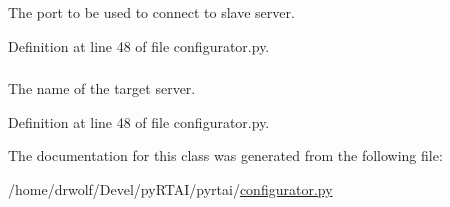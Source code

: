 \-The port to be used to connect to slave server. 



\-Definition at line 48 of file configurator.\-py.

\hypertarget{classpyrtai_1_1configurator_1_1_configurator_af1c86542bd418acd02cd9a9a01740458}{
\subsubsection[{target\-\_\-name}]{}}
\label{classpyrtai_1_1configurator_1_1_configurator_af1c86542bd418acd02cd9a9a01740458}


\-The name of the target server. 



\-Definition at line 48 of file configurator.\-py.



\-The documentation for this class was generated from the following file\-:\begin{DoxyCompactItemize}
\item 
/home/drwolf/\-Devel/py\-R\-T\-A\-I/pyrtai/\hyperlink{configurator_8py}{configurator.\-py}\end{DoxyCompactItemize}
